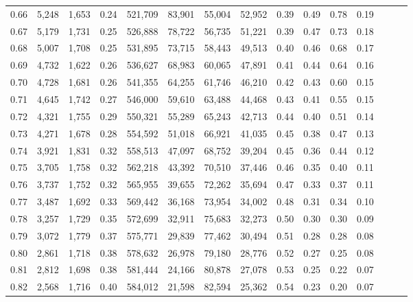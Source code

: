 \begin{tabular}{rrrrrrrrrrrrrrr}
0.66 &  5,248 &  1,653 &  0.24 &  521,709 &   83,901 &   55,004 &   52,952 &  0.39 &  0.49 &  0.78 &      0.19 \\
0.67 &  5,179 &  1,731 &  0.25 &  526,888 &   78,722 &   56,735 &   51,221 &  0.39 &  0.47 &  0.73 &      0.18 \\
0.68 &  5,007 &  1,708 &  0.25 &  531,895 &   73,715 &   58,443 &   49,513 &  0.40 &  0.46 &  0.68 &      0.17 \\
0.69 &  4,732 &  1,622 &  0.26 &  536,627 &   68,983 &   60,065 &   47,891 &  0.41 &  0.44 &  0.64 &      0.16 \\
0.70 &  4,728 &  1,681 &  0.26 &  541,355 &   64,255 &   61,746 &   46,210 &  0.42 &  0.43 &  0.60 &      0.15 \\
0.71 &  4,645 &  1,742 &  0.27 &  546,000 &   59,610 &   63,488 &   44,468 &  0.43 &  0.41 &  0.55 &      0.15 \\
0.72 &  4,321 &  1,755 &  0.29 &  550,321 &   55,289 &   65,243 &   42,713 &  0.44 &  0.40 &  0.51 &      0.14 \\
0.73 &  4,271 &  1,678 &  0.28 &  554,592 &   51,018 &   66,921 &   41,035 &  0.45 &  0.38 &  0.47 &      0.13 \\
0.74 &  3,921 &  1,831 &  0.32 &  558,513 &   47,097 &   68,752 &   39,204 &  0.45 &  0.36 &  0.44 &      0.12 \\
0.75 &  3,705 &  1,758 &  0.32 &  562,218 &   43,392 &   70,510 &   37,446 &  0.46 &  0.35 &  0.40 &      0.11 \\
0.76 &  3,737 &  1,752 &  0.32 &  565,955 &   39,655 &   72,262 &   35,694 &  0.47 &  0.33 &  0.37 &      0.11 \\
0.77 &  3,487 &  1,692 &  0.33 &  569,442 &   36,168 &   73,954 &   34,002 &  0.48 &  0.31 &  0.34 &      0.10 \\
0.78 &  3,257 &  1,729 &  0.35 &  572,699 &   32,911 &   75,683 &   32,273 &  0.50 &  0.30 &  0.30 &      0.09 \\
0.79 &  3,072 &  1,779 &  0.37 &  575,771 &   29,839 &   77,462 &   30,494 &  0.51 &  0.28 &  0.28 &      0.08 \\
0.80 &  2,861 &  1,718 &  0.38 &  578,632 &   26,978 &   79,180 &   28,776 &  0.52 &  0.27 &  0.25 &      0.08 \\
0.81 &  2,812 &  1,698 &  0.38 &  581,444 &   24,166 &   80,878 &   27,078 &  0.53 &  0.25 &  0.22 &      0.07 \\
0.82 &  2,568 &  1,716 &  0.40 &  584,012 &   21,598 &   82,594 &   25,362 &  0.54 &  0.23 &  0.20 &      0.07 \\

\end{tabular}

